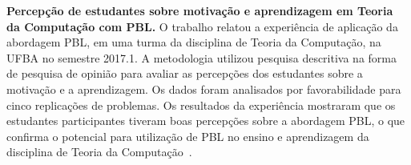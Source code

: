 \item{\textbf{Percepção de estudantes sobre
motivação e aprendizagem em Teoria da
Computação com \ac{PBL}.}
O trabalho relatou a experiência de aplicação da abordagem
\ac{PBL}, em uma turma da disciplina de Teoria da Computação, na
\ac{UFBA} no semestre 2017.1.
A metodologia utilizou pesquisa descritiva na forma de pesquisa
de opinião para avaliar as percepções dos estudantes sobre
a motivação e a aprendizagem.
Os dados foram analisados por favorabilidade para cinco
replicações de problemas.
Os resultados da experiência mostraram que os estudantes
participantes tiveram boas percepções sobre a abordagem \ac{PBL},
o que confirma o potencial para utilização de \ac{PBL}
no ensino e aprendizagem da disciplina de Teoria
da Computação~\cite{gavaza2018}.}
